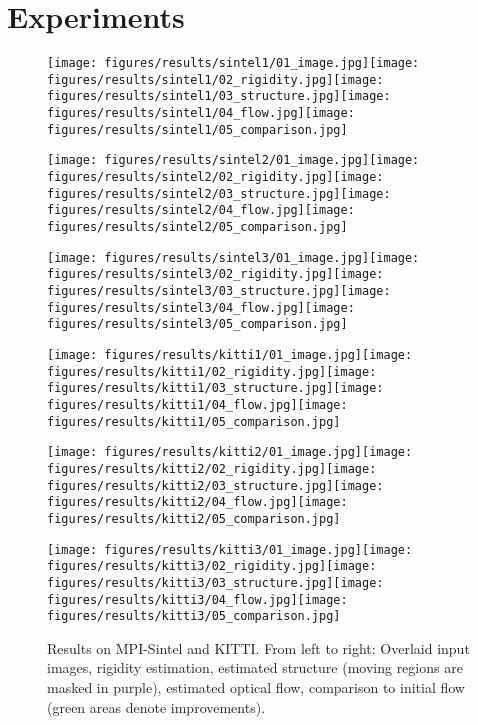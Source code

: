\documentclass[10pt,twocolumn,letterpaper]{article}
\begin{document}
	 
%
 \section{Experiments}
\newcommand{\resultwidth}{0.20\textwidth}
\begin{figure*}[ht]
\centerline{
		\texttt{[image: figures/results/sintel1/01\_image.jpg]}\texttt{[image: figures/results/sintel1/02\_rigidity.jpg]}\texttt{[image: figures/results/sintel1/03\_structure.jpg]}\texttt{[image: figures/results/sintel1/04\_flow.jpg]}\texttt{[image: figures/results/sintel1/05\_comparison.jpg]}}\centerline{
		\texttt{[image: figures/results/sintel2/01\_image.jpg]}\texttt{[image: figures/results/sintel2/02\_rigidity.jpg]}\texttt{[image: figures/results/sintel2/03\_structure.jpg]}\texttt{[image: figures/results/sintel2/04\_flow.jpg]}\texttt{[image: figures/results/sintel2/05\_comparison.jpg]}}\centerline{
		\texttt{[image: figures/results/sintel3/01\_image.jpg]}\texttt{[image: figures/results/sintel3/02\_rigidity.jpg]}\texttt{[image: figures/results/sintel3/03\_structure.jpg]}\texttt{[image: figures/results/sintel3/04\_flow.jpg]}\texttt{[image: figures/results/sintel3/05\_comparison.jpg]}}\centerline{
		\texttt{[image: figures/results/kitti1/01\_image.jpg]}\texttt{[image: figures/results/kitti1/02\_rigidity.jpg]}\texttt{[image: figures/results/kitti1/03\_structure.jpg]}\texttt{[image: figures/results/kitti1/04\_flow.jpg]}\texttt{[image: figures/results/kitti1/05\_comparison.jpg]}}\centerline{
		\texttt{[image: figures/results/kitti2/01\_image.jpg]}\texttt{[image: figures/results/kitti2/02\_rigidity.jpg]}\texttt{[image: figures/results/kitti2/03\_structure.jpg]}\texttt{[image: figures/results/kitti2/04\_flow.jpg]}\texttt{[image: figures/results/kitti2/05\_comparison.jpg]}}\centerline{
		\texttt{[image: figures/results/kitti3/01\_image.jpg]}\texttt{[image: figures/results/kitti3/02\_rigidity.jpg]}\texttt{[image: figures/results/kitti3/03\_structure.jpg]}\texttt{[image: figures/results/kitti3/04\_flow.jpg]}\texttt{[image: figures/results/kitti3/05\_comparison.jpg]}}		
	\caption{Results on MPI-Sintel and KITTI. From left to right: Overlaid input images, rigidity estimation, estimated structure (moving regions are masked in purple), estimated optical flow, comparison to initial flow (green areas denote improvements).} \label{fig:results}
\end{figure*}
\end{document}
